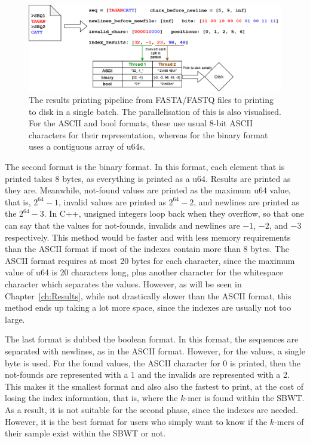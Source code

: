 \begin{figure}[t]
  \centering
  \includegraphics[width=\textwidth]{images/IndexResultsPrinting.png}
  \caption{The results printing pipeline from FASTA/FASTQ files to printing to disk in a single batch. The parallelisation of this is also visualised. For the ASCII and bool formats, these use usual 8-bit ASCII characters for their representation, whereas for the binary format uses a contiguous array of u64s.}\label{fig:IndexResultsPrinting}
\end{figure}

The second format is the binary format.
In this format, each element that is printed takes 8 bytes, as everything is printed as a u64.
Results are printed as they are.
Meanwhile, not-found values are printed as the maximum u64 value, that is, $2^{64} - 1$, invalid values are printed as $2^{64} - 2$, and newlines are printed as the $2^{64} - 3$.
In C++, unsigned integers loop back when they overflow, so that one can say that the values for not-founds, invalids and newlines are $-1$, $-2$, and $-3$ respectively.
This method would be faster and with less memory requirements than the ASCII format if most of the indexes contain more than 8 bytes.
The ASCII format requires at most 20 bytes for each character, since the maximum value of u64 is 20 characters long, plus another character for the whitespace character which separates the values.
However, as will be seen in Chapter~\ref{ch:Results}, while not drastically slower than the ASCII format, this method ends up taking a lot more space, since the indexes are usually not too large.

The last format is dubbed the boolean format.
In this format, the sequences are separated with newlines, as in the ASCII format.
However, for the values, a single byte is used.
For the found values, the ASCII character for 0 is printed, then the not-founds are represented with a 1 and the invalids are represented with a 2.
This makes it the smallest format and also also the fastest to print, at the cost of losing the index information, that is, where the $k$-mer is found within the SBWT.
As a result, it is not suitable for the second phase, since the indexes are needed.
However, it is the best format for users who simply want to know if the $k$-mers of their sample exist within the SBWT or not.
